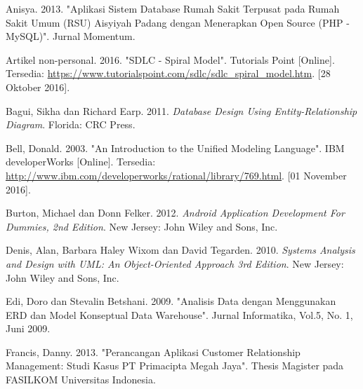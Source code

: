 \documentclass{jtetiskripsi}
\begin{document}









%
\begin{thebibliography}{99}
	Anisya. 2013. "Aplikasi Sistem Database Rumah Sakit Terpusat pada Rumah Sakit Umum (RSU) Aisyiyah Padang dengan Menerapkan Open Source (PHP - MySQL)". Jurnal Momentum.

	 Artikel non-personal.  2016. "SDLC - Spiral Model".  Tutorials Point [Online]. Tersedia: \url{https://www.tutorialspoint.com/sdlc/sdlc_spiral_model.htm}. [28 Oktober 2016].
	
	Bagui, Sikha dan Richard Earp. 2011. \textit{Database Design Using Entity-Relationship Diagram}. Florida: CRC Press.	
	
	 Bell, Donald.  2003. "An Introduction to the Unified Modeling Language".  IBM developerWorks [Online]. Tersedia: \url{http://www.ibm.com/developerworks/rational/library/769.html}. [01 November 2016].
	
	Burton, Michael dan Donn Felker. 2012. \textit{Android Application Development For Dummies, 2nd Edition}. New Jersey: John Wiley and Sons, Inc.	
	
	Denis, Alan, Barbara Haley Wixom dan David Tegarden. 2010. \textit{Systems Analysis and Design with UML: An Object-Oriented Approach 3rd Edition}. New Jersey: John Wiley and Sons, Inc.
	
	 Edi, Doro dan Stevalin Betshani. 2009. "Analisis Data dengan Menggunakan ERD dan Model Konseptual Data Warehouse". Jurnal Informatika, Vol.5, No. 1, Juni 2009.
	
	 Francis, Danny. 2013. "Perancangan Aplikasi Customer Relationship Management: Studi Kasus PT Primacipta Megah Jaya". Thesis Magister pada FASILKOM Universitas Indonesia.


\end{thebibliography}
\end{document}

